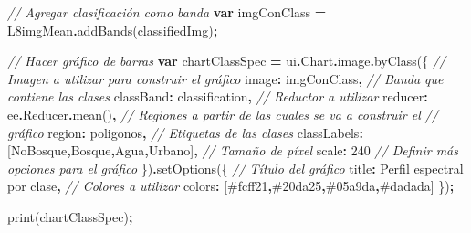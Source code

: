 \documentclass[
  12pt,
  letterpaper,
  twoside]{book}
\newenvironment{Shaded}{\begin{snugshade}}{\end{snugshade}}
\newcommand{\AttributeTok}[1]{\textcolor[rgb]{0.77,0.63,0.00}{#1}}
\newcommand{\CommentTok}[1]{\textcolor[rgb]{0.56,0.35,0.01}{\textit{#1}}}
\newcommand{\DataTypeTok}[1]{\textcolor[rgb]{0.13,0.29,0.53}{#1}}
\newcommand{\DecValTok}[1]{\textcolor[rgb]{0.00,0.00,0.81}{#1}}
\newcommand{\FunctionTok}[1]{\textcolor[rgb]{0.00,0.00,0.00}{#1}}
\newcommand{\KeywordTok}[1]{\textcolor[rgb]{0.13,0.29,0.53}{\textbf{#1}}}
\newcommand{\NormalTok}[1]{#1}
\newcommand{\OperatorTok}[1]{\textcolor[rgb]{0.81,0.36,0.00}{\textbf{#1}}}
\newcommand{\StringTok}[1]{\textcolor[rgb]{0.31,0.60,0.02}{#1}}
\begin{document}
\begin{Shaded}
\begin{Highlighting}[]
\CommentTok{// Agregar clasificación como banda}
\KeywordTok{var}\NormalTok{ imgConClass }\OperatorTok{=}\NormalTok{ L8imgMean}\OperatorTok{.}\FunctionTok{addBands}\NormalTok{(classifiedImg)}\OperatorTok{;}

\CommentTok{// Hacer gráfico de barras}
\KeywordTok{var}\NormalTok{ chartClassSpec }\OperatorTok{=}\NormalTok{ ui}\OperatorTok{.}\AttributeTok{Chart}\OperatorTok{.}\AttributeTok{image}\OperatorTok{.}\FunctionTok{byClass}\NormalTok{(\{}
  \CommentTok{// Imagen a utilizar para construir el gráfico}
  \DataTypeTok{image}\OperatorTok{:}\NormalTok{ imgConClass}\OperatorTok{,}
  \CommentTok{// Banda que contiene las clases}
  \DataTypeTok{classBand}\OperatorTok{:} \StringTok{\textquotesingle{}classification\textquotesingle{}}\OperatorTok{,}
  \CommentTok{// Reductor a utilizar}
  \DataTypeTok{reducer}\OperatorTok{:}\NormalTok{ ee}\OperatorTok{.}\AttributeTok{Reducer}\OperatorTok{.}\FunctionTok{mean}\NormalTok{()}\OperatorTok{,}
  \CommentTok{// Regiones a partir de las cuales se va a construir el }
  \CommentTok{// gráfico}
  \DataTypeTok{region}\OperatorTok{:}\NormalTok{ poligonos}\OperatorTok{,}
  \CommentTok{// Etiquetas de las clases}
  \DataTypeTok{classLabels}\OperatorTok{:}\NormalTok{ [}\StringTok{\textquotesingle{}NoBosque\textquotesingle{}}\OperatorTok{,}\StringTok{\textquotesingle{}Bosque\textquotesingle{}}\OperatorTok{,}\StringTok{\textquotesingle{}Agua\textquotesingle{}}\OperatorTok{,}\StringTok{\textquotesingle{}Urbano\textquotesingle{}}\NormalTok{]}\OperatorTok{,}
  \CommentTok{// Tamaño de píxel}
  \DataTypeTok{scale}\OperatorTok{:} \DecValTok{240}
  \CommentTok{// Definir más opciones para el gráfico}
\NormalTok{\})}\OperatorTok{.}\FunctionTok{setOptions}\NormalTok{(\{}
  \CommentTok{// Título del gráfico}
  \DataTypeTok{title}\OperatorTok{:} \StringTok{\textquotesingle{}Perfil espectral por clase\textquotesingle{}}\OperatorTok{,}
  \CommentTok{// Colores a utilizar}
  \DataTypeTok{colors}\OperatorTok{:}\NormalTok{ [}\StringTok{\textquotesingle{}\#fcff21\textquotesingle{}}\OperatorTok{,}\StringTok{\textquotesingle{}\#20da25\textquotesingle{}}\OperatorTok{,}\StringTok{\textquotesingle{}\#05a9da\textquotesingle{}}\OperatorTok{,}\StringTok{\textquotesingle{}\#dadada\textquotesingle{}}\NormalTok{]}
\NormalTok{\})}\OperatorTok{;}

\FunctionTok{print}\NormalTok{(chartClassSpec)}\OperatorTok{;}
\end{Highlighting}
\end{Shaded}
\end{document}
